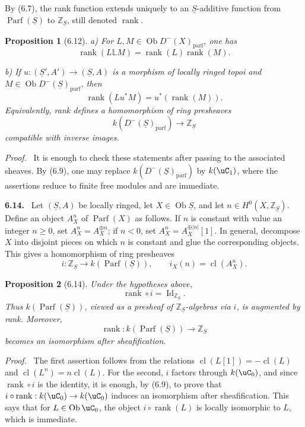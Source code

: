 \documentclass[11pt]{article}
\theoremstyle{plain}
\newtheorem*{proposition*}{Proposition}
\theoremstyle{definition}
\theoremstyle{remark}
\newenvironment{statement}[1]{\par\medskip\noindent\textbf{#1.}\ }{\par\medskip}
\newenvironment{prooftext}{\par\noindent\textit{Proof.}\ }{\par\medskip}
\newcommand{\ZZ}{\mathbb Z}
\DeclareMathOperator{\ob}{Ob}
\providecommand{\Parf}{\operatorname{Parf}}
\providecommand{\uS}{\underline{S}}
\providecommand{\rg}{\operatorname{rank}}
\providecommand{\bbL}{\mathbb{L}}
\begin{document}
By (6.7), the rank function extends uniquely to an $\uS$-additive function from $\Parf(\uS)$ to $\ZZ_{\uS}$, still denoted $\rg$.

\begin{proposition*}[6.12]
\textup{a)} For $L,M\in\ob D^-(X)_{\mathrm{parf}}$, one has
\[
\rg(L\bbL M)=\rg(L)\rg(M).
\]

\textup{b)} If $u:(\uS',A')\to(\uS,A)$ is a morphism of locally ringed topoi and $M\in\ob D^-(\uS)_{\mathrm{parf}}$, then
\[
\rg(Lu^*M)=u^*(\rg(M)).
\]
Equivalently, rank defines a homomorphism of ring presheaves
\[
k(D^-(\uS)_{\mathrm{parf}})\longrightarrow\ZZ_{\uS}
\]
compatible with inverse images.
\end{proposition*}

\begin{prooftext}
It is enough to check these statements after passing to the associated sheaves. By (6.9), one may replace $k(D^-(\uS)_{\mathrm{parf}})$ by $k(\uC_1)$, where the assertions reduce to finite free modules and are immediate.
\end{prooftext}

\begin{statement}{6.14}
Let $(\uS,A)$ be locally ringed, let $X\in\ob\uS$, and let $n\in H^0(X,\ZZ_{\uS})$. Define an object $A_X^n$ of $\Parf(X)$ as follows. If $n$ is constant with value an integer $n\geq0$, set $A_X^n=A_X^{\oplus n}$; if $n<0$, set $A_X^n=A_X^{\oplus |n|}[1]$. In general, decompose $X$ into disjoint pieces on which $n$ is constant and glue the corresponding objects. This gives a homomorphism of ring presheaves
\[
i:\ZZ_{\uS}\longrightarrow k(\Parf(\uS)),
\qquad i_X(n)=\operatorname{cl}(A_X^n).
\]
\end{statement}

\begin{proposition*}[6.14]
Under the hypotheses above,
\[
\rg\circ i=\operatorname{Id}_{\ZZ_{\uS}}.
\]
Thus $k(\Parf(\uS))$, viewed as a presheaf of $\ZZ_{\uS}$-algebras via $i$, is augmented by rank. Moreover,
\[
\rg:k(\Parf(\uS))\longrightarrow\ZZ_{\uS}
\]
becomes an isomorphism after sheafification.
\end{proposition*}

\begin{prooftext}
The first assertion follows from the relations $\operatorname{cl}(L[1])=-\operatorname{cl}(L)$ and $\operatorname{cl}(L^n)=n\operatorname{cl}(L)$. For the second, $i$ factors through $k(\uC_0)$, and since $\rg\circ i$ is the identity, it is enough, by (6.9), to prove that $i\circ\rg:k(\uC_0)\to k(\uC_0)$ induces an isomorphism after sheafification. This says that for $L\in\ob\uC_0$, the object $i\circ\rg(L)$ is locally isomorphic to $L$, which is immediate.
\end{prooftext}
\end{document}
